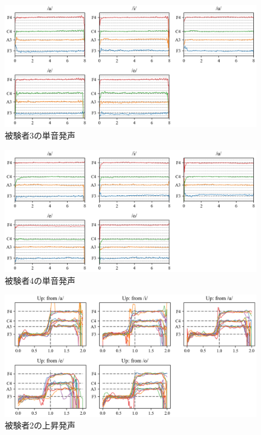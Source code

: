 \documentclass[10.5ptj,a4j,dvipdfmx,uplatex, oneside, openany, report, draft]{jsbook}%
\begin{document}
\begin{figure}[htbp]
    \begin{center}
      \includegraphics[clip,width=16.0cm]{F0_long_3.png}
      \caption{被験者3の単音発声}
      \label{fig:3}
    \end{center}

\end{figure}

\begin{figure}[htbp]
    \begin{center}
      \includegraphics[clip,width=16.0cm]{F0_long_4.png}
      \caption{被験者4の単音発声}
      \label{fig:4}
    \end{center}
\end{figure}





\begin{figure}[htbp]
    \begin{center}
      \includegraphics[clip,width=16.0cm]{F0_up_2.png}
      \caption{被験者2の上昇発声}
      \label{fig:u2}
    \end{center}
\end{figure}
\end{document}
